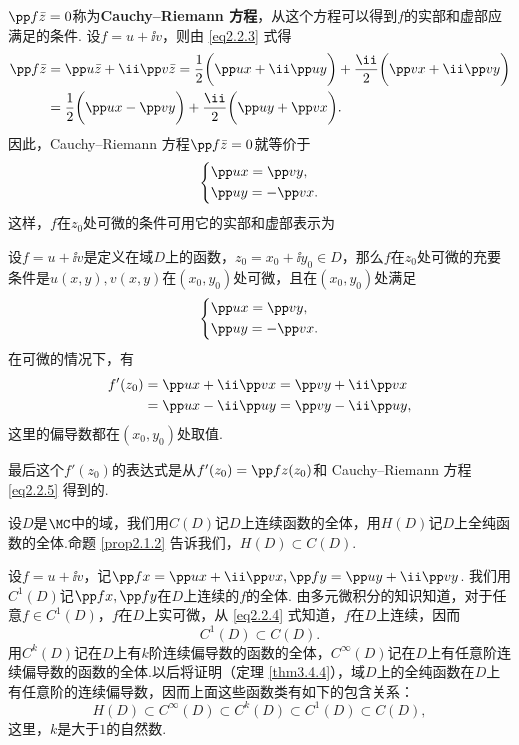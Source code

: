 $\pp f{\bar z}=0$称为\textbf{Cauchy--Riemann 方程}，从这个方程可以得到$f$的实部和虚部应满足的条件. 设$f=u+\ii v$，则由 \eqref{eq2.2.3} 式得
\begin{align*}
  \pp f{\bar z}&=\pp u{\bar z}+\ii\pp v{\bar z}=\frac12\bigg(\pp ux+\ii \pp uy\bigg)
  +\frac{\ii}2\bigg(\pp vx+\ii\pp vy\bigg)\\
  &=\frac12\bigg(\pp ux-\pp vy\bigg)+\frac{\ii}2\bigg(\pp uy+\pp vx\bigg).
\end{align*}
因此，Cauchy--Riemann 方程$\pp f{\bar z}=0$就等价于
\begin{equation}\label{eq2.2.5}
\left\{\begin{aligned}
&\pp ux=\pp vy,\\
&\pp uy=-\pp vx.
\end{aligned}\right.
\end{equation}
这样，$f$在$z_0$处可微的条件可用它的实部和虚部表示为
\begin{theorem}\label{thm2.2.4}
设$f=u+\ii v$是定义在域$D$上的函数，$z_0=x_0+\ii y_0\in D$，那么$f$在$z_0$处可微的充要条件是$u(x,y),v(x,y)$在$(x_0,y_0)$处可微，且在$(x_0,y_0)$处满足
\begin{equation*}
\left\{\begin{aligned}
&\pp ux=\pp vy,\\
&\pp uy=-\pp vx.
\end{aligned}\right.
\end{equation*}
在可微的情况下，有
\begin{align*}
  f'(z_0)&=\pp ux+\ii \pp vx=\pp vy+\ii \pp vx\\
  &=\pp ux-\ii\pp uy=\pp vy-\ii \pp uy,
\end{align*}
这里的偏导数都在$(x_0,y_0)$处取值.
\end{theorem}

最后这个$f'(z_0)$的表达式是从$f'(z_0)=\pp fz(z_0)$和 Cauchy--Riemann 方程 \eqref{eq2.2.5} 得到的.

设$D$是$\MC$中的域，我们用$C(D)$记$D$上连续函数的全体，用$H(D)$记$D$上全纯函数的全体.命题 \ref{prop2.1.2} 告诉我们，$H(D)\subset C(D)$.

设$f=u+\ii v$，记$\pp fx=\pp ux+\ii\pp vx,\pp fy=\pp uy+\ii\pp vy$. 我们用$C^1(D)$记$\pp fx,\pp fy$在$D$上连续的$f$的全体. 由多元微积分的知识知道，对于任意$f\in C^1(D)$，$f$在$D$上实可微，从 \eqref{eq2.2.4} 式知道，$f$在$D$上连续，因而
\[C^1(D)\subset C(D).\]
用$C^k(D)$记在$D$上有$k$阶连续偏导数的函数的全体，$C^\infty(D)$记在$D$上有任意阶连续偏导数的函数的全体.以后将证明（定理 \ref{thm3.4.4}），域$D$上的全纯函数在$D$上有任意阶的连续偏导数，因而上面这些函数类有如下的包含关系：
\[H(D)\subset C^\infty(D)\subset C^k(D)\subset C^1(D)\subset C(D),\]
这里，$k$是大于$1$的自然数.

